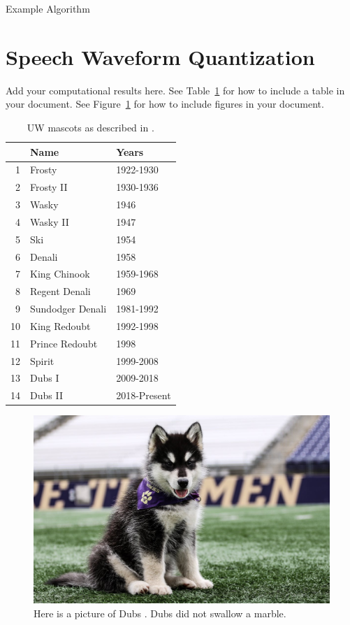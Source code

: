 \documentclass{article}
\begin{document}
\begin{algorithm}
\begin{algorithmic}
    \ENDFOR
    \ELSE
        \ENDIF
    \ENDIF 
\end{algorithmic}
\caption{Example Algorithm}
\label{alg:example}
\end{algorithm}

\section{Speech Waveform Quantization}
Add your computational results here. See Table~\ref{tab:mascots} for how to include a table in your document. See Figure~\ref{fig:dubs} for how to include figures in your document.

\begin{table}
    \centering
    \begin{tabular}{rll}
    & Name & Years \\
    \hline
    1 & Frosty & 1922-1930  \\
    2 & Frosty II & 1930-1936 \\
    3 & Wasky & 1946 \\
    4 & Wasky II & 1947 \\
    5 & Ski & 1954 \\
    6 & Denali & 1958 \\
    7 & King Chinook & 1959-1968\\
    8 & Regent Denali & 1969 \\
    9 & Sundodger Denali & 1981-1992 \\
    10 & King Redoubt & 1992-1998 \\
    11 & Prince Redoubt & 1998 \\
    12 & Spirit & 1999-2008 \\
    13 & Dubs I & 2009-2018 \\
    14 & Dubs II & 2018-Present
    \end{tabular}
    \caption{UW mascots as described in \cite{washington_huskies}.}
    \label{tab:mascots}
\end{table}

\begin{figure}
    \centering
    \includegraphics[width=0.5\linewidth]{dubs.jpg}
    \caption{Here is a picture of Dubs \cite{webeck_2018}. Dubs did not swallow a marble.}
    \label{fig:dubs}
\end{figure}
\end{document}
